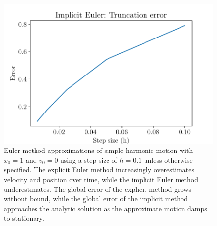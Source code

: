 \documentclass{article}
\theoremstyle{definition}
\begin{document}
\begin{figure}
\includegraphics[width=.35\textwidth]{p1_5_3.pdf}
\caption{Euler method approximations of simple harmonic motion with $x_0 = 1$ and $v_0=0$ using a step size of $h=0.1$ unless otherwise specified. The explicit Euler method increasingly overestimates velocity and position over time, while the implicit Euler method underestimates. The global error of the explicit method grows without bound, while the global error of the implicit method approaches the analytic solution as the approximate motion damps to stationary.}
\label{fig:motion}
\end{figure}
\end{document}
